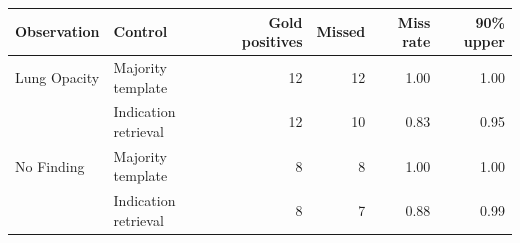 \begin{tabular}{llrrrr}
\toprule
Observation & Control & Gold positives & Missed & Miss rate & 90\% upper \\
\midrule
Lung Opacity & Majority template & 12 & 12 & 1.00 & 1.00 \\
 & Indication retrieval & 12 & 10 & 0.83 & 0.95 \\
No Finding & Majority template & 8 & 8 & 1.00 & 1.00 \\
 & Indication retrieval & 8 & 7 & 0.88 & 0.99 \\
\bottomrule
\end{tabular}
